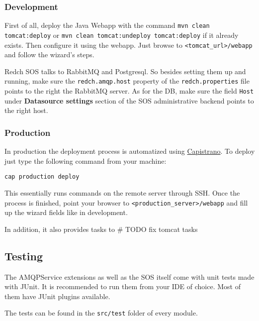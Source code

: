 \subsubsection*{Development}\label{development}

First of all, deploy the Java Webapp with the command
\texttt{mvn clean tomcat:deploy} or
\texttt{mvn clean tomcat:undeploy tomcat:deploy} if it already exists.
Then configure it using the webapp. Just browse to
\texttt{\textless{}tomcat\_url\textgreater{}/webapp} and follow the
wizard's steps.

Redch SOS talks to RabbitMQ and Postgresql. So besides setting them up
and running, make sure the \texttt{redch.amqp.host} property of the
\texttt{redch.properties} file points to the right the RabbitMQ server.
As for the DB, make sure the field \texttt{Host} under
\textbf{Datasource settings} section of the SOS administrative backend
points to the right host.

\subsubsection*{Production}\label{production}

In production the deployment process is automatized using
\href{http://capistranorb.com/}{Capistrano}. To deploy just type the
following command from your machine:

\begin{verbatim}
cap production deploy
\end{verbatim}

This essentially runs commands on the remote server through SSH. Once
the process is finished, point your browser to
\texttt{\textless{}production\_server\textgreater{}/webapp} and fill up
the wizard fields like in development.

In addition, it also provides tasks to \# TODO fix tomcat tasks

\subsection*{Testing}\label{testing}

The AMQPService extensions as well as the SOS itself come with unit
tests made with JUnit. It is recommended to run them from your IDE of
choice. Most of them have JUnit plugins available.

The tests can be found in the \texttt{src/test} folder of every module.

\clearpage
\newpage
